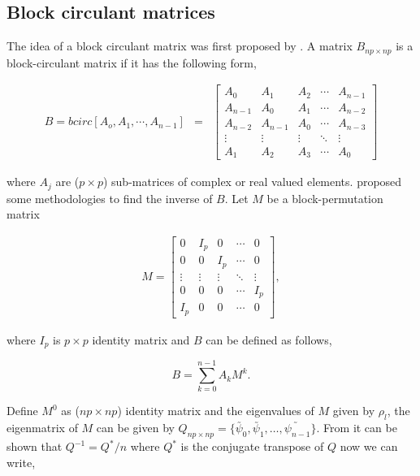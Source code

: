 \subsection{\bf Block circulant matrices}

The idea of a block circulant matrix was first proposed by \cite{Muir1920}. A matrix $B_{np\times np}$ is a block-circulant matrix if it has the following form,


\begin{eqnarray}
	B = bcirc[A_o, A_1,\cdots,A_{n-1}] &=& \left[
		\begin{array}{lllll}
			A_0     & A_1     & A_2    & \cdots & A_{n-1} \\
			A_{n-1} & A_0     & A_1    & \cdots & A_{n-2} \\
			A_{n-2} & A_{n-1} & A_0    & \cdots & A_{n-3} \\
			\vdots  & \vdots  & \vdots & \ddots & \vdots  \\
			A_1     & A_2     & A_3    & \cdots & A_0
		\end{array}
	\right]
\end{eqnarray}

\noi where $A_j$ are ($p \times p$) sub-matrices of complex or real valued elements. \cite{DeMazancourt1983} proposed some methodologies to find the inverse of $B$. Let $M$ be a block-permutation matrix

\begin{eqnarray*}
	M = \left[
		\begin{array}{lllll}
			0       & I_p     & 0      & \cdots & 0 \\
			0       & 0       & I_p    & \cdots & 0 \\
			\vdots  & \vdots  & \vdots & \ddots & \vdots  \\
			0       & 0       & 0      & \cdots & I_p \\
			I_p     & 0     & 0    & \cdots & 0
		\end{array}
	\right],
\end{eqnarray*}

\noi where $I_p$ is $p\times p$ identity matrix and $B$ can be defined as follows,

\[
B = \sum_{k=0}^{n-1} A_k M^k.
\]

Define $M^0$ as ($np\times np$) identity matrix and the eigenvalues of $M$ given by $\rho_l$, the eigenmatrix of $M$ can be given by $Q_{np\times np}=\{ \utilde{\psi_0}, \utilde{\psi_1},\ldots, \utilde{\psi_{n-1}} \}$. From \cite{Trapp1973} it can be shown that $Q^{-1} = Q^*/n$ where $Q^*$ is the conjugate transpose of $Q$ now we can write,

